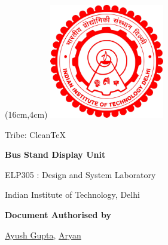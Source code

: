 
\begin{titlepage}
    

       \begin{textblock*}{2mm}(16cm,4cm)
       \includegraphics[width=50mm]{Files/Images/iitdlogo.png}
       \end{textblock*}
            \vskip2in
	        \raggedright
            \vskip3.5in
              {%
				\fontsize{20}{28}
				\boldmath
				\sffamily
				 Tribe: CleanTeX
				\par
            }
             \vskip0.25in
           
             {
				\Large
				\fontsize{28}{32}
				\bfseries
				\boldmath
				\sffamily
                Bus Stand Display Unit
				\par
            }
            \vskip0.15in
             {
				\fontsize{18}{18}
				\sffamily
                
				\par
            }
            \vskip0.15in
             {
				\fontsize{16}{16}
				\sffamily
                ELP305 : Design and System Laboratory
				\par
            }
            \vskip0.15in
             {
				\fontsize{16}{14}
				\sffamily
                Indian Institute of Technology, Delhi	
                \par
            }
    \vspace{1.in}
    {
        \normalsize
        \sffamily
        \textbf{Document Authorised by}\par \vspace{0.125cm}
        {\href{https://www.linkedin.com/in/ayush-gupta-undergraduate/}{Ayush Gupta}, \href{www.linkedin.com}{Aryan}}

}
\end{titlepage}
